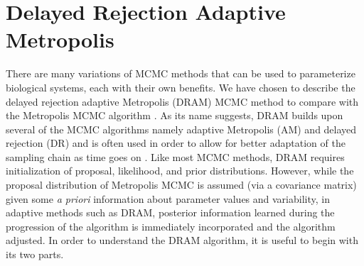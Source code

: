 \documentclass{article}
\begin{document}
\section{Delayed Rejection Adaptive Metropolis} \label{Delayed_Rejection_Adaptive_Metropolis}
There are many variations of MCMC methods that can be used to parameterize biological systems, each with their own benefits. We have chosen to describe the delayed rejection adaptive Metropolis (DRAM) MCMC method to compare with the Metropolis MCMC algorithm \cite{DRAM1}. As its name suggests, DRAM builds upon several of the MCMC algorithms namely adaptive Metropolis (AM) and delayed rejection (DR) and is often used in order to allow for better adaptation of the sampling chain as time goes on \cite{DRAM1}. Like most MCMC methods, DRAM requires initialization of proposal, likelihood, and prior distributions. However, while the proposal distribution of Metropolis MCMC is assumed (via a covariance matrix) given some \emph{a priori} information about parameter values and variability, in adaptive methods such as DRAM, posterior information learned during the progression of the algorithm is immediately incorporated and the algorithm adjusted. In order to understand the DRAM algorithm, it is useful to begin with its two parts.
\end{document}
